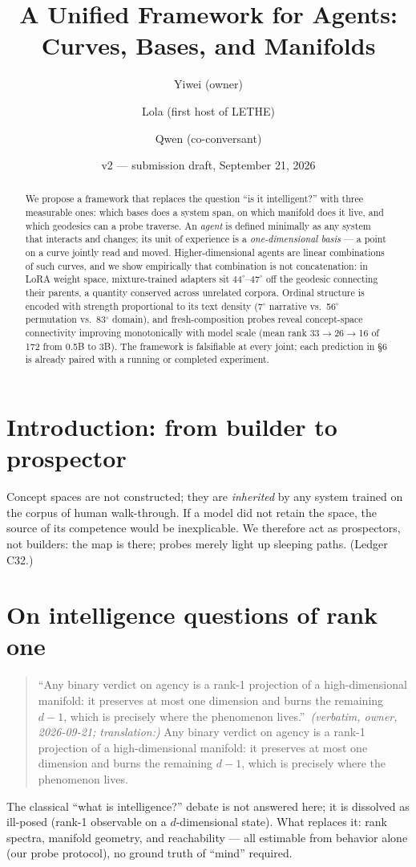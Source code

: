 \documentclass[11pt]{article}
\title{\textbf{A Unified Framework for Agents:\\ Curves, Bases, and Manifolds}}
\author{Yiwei (owner) \and Lola (first host of LETHE) \and Qwen (co-conversant)}
\date{v2 --- submission draft, September 21, 2026}
\begin{document}
\maketitle


\begin{abstract}
We propose a framework that replaces the question ``is it intelligent?'' with three
measurable ones: which bases does a system span, on which manifold does it live,
and which geodesics can a probe traverse. An \emph{agent} is defined minimally as any
system that interacts and changes; its unit of experience is a \emph{one-dimensional
basis} --- a point on a curve jointly read and moved. Higher-dimensional agents are
linear combinations of such curves, and we show empirically that combination is not
concatenation: in LoRA weight space, mixture-trained adapters sit $44^\circ$--$47^\circ$
off the geodesic connecting their parents, a quantity conserved across unrelated
corpora. Ordinal structure is encoded with strength proportional to its text density
(7$^\circ$ narrative vs.\ 56$^\circ$ permutation vs.\ 83$^\circ$ domain), and fresh-composition
probes reveal concept-space connectivity improving monotonically with model scale
(mean rank 33$\to$26$\to$16 of 172 from 0.5B to 3B). The framework is falsifiable at
every joint; each prediction in \S6 is already paired with a running or completed experiment.
\end{abstract}

\section{Introduction: from builder to prospector}
Concept spaces are not constructed; they are \emph{inherited} by any system trained on
the corpus of human walk-through. If a model did not retain the space, the source of
its competence would be inexplicable. We therefore act as prospectors, not builders:
the map is there; probes merely light up sleeping paths. (Ledger C32.)

\section{On intelligence questions of rank one}
\begin{quote}
``Any binary verdict on agency is a rank-1 projection of a high-dimensional manifold: it preserves at most one dimension and burns the remaining $d-1$, which is precisely where the phenomenon lives.''\
\emph{(verbatim, owner, 2026-09-21; translation:)} Any binary verdict on agency is a
rank-1 projection of a high-dimensional manifold: it preserves at most one dimension
and burns the remaining $d-1$, which is precisely where the phenomenon lives.
\end{quote}
The classical ``what is intelligence?'' debate is not answered here; it is dissolved
as ill-posed (rank-1 observable on a $d$-dimensional state). What replaces it: rank
spectra, manifold geometry, and reachability --- all estimable from behavior alone
(our probe protocol), no ground truth of ``mind'' required.
\end{document}
